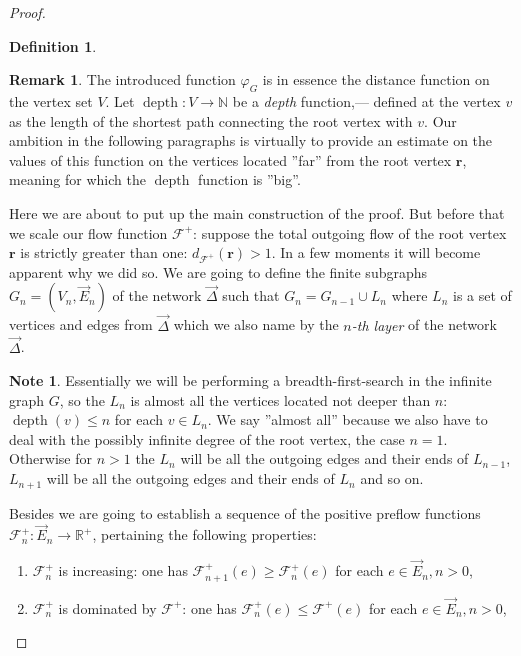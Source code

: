 \documentclass[12pt]{article}
\renewcommand{\leq}{\leqslant}
\renewcommand{\geq}{\geqslant}
\newcommand{\gfi}{\varphi_{G}}
\theoremstyle{definition}
\newtheorem{remark}{Remark}
\newtheorem*{note}{Note}
\newtheorem{definition}{Definition}
\newcommand{\depth}{\operatorname{depth}}
\newcommand{\flowpos}{\mathcal{F}^{+}}
\newcommand{\flowposn}[1]{\mathcal{F}_{#1}^{+}}
\renewcommand{\root}{\mathbf{r}}
\newcommand{\onet}{\vec{\Delta}}
\numberwithin{remark}{section}
\numberwithin{theorem}{section}
\numberwithin{prop}{section}
\numberwithin{equation}{section}
\numberwithin{lemma}{section}
\numberwithin{prop_under_lemma}{lemma}
\begin{document}
\begin{proof}
\begin{definition}
\[        \]
      \end{definition}
      \begin{remark}
        The introduced function $\gfi$ is in essence the distance function on the vertex set $V$.
        Let $\depth: V \to \mathbb{N}$ be a \emph{depth} function,--- defined at the vertex $v$ as the length of the shortest path connecting the root vertex with
          $v$.
        Our ambition in the following paragraphs is virtually to provide an estimate on the values of this function on the vertices
          located ''far'' from the root vertex $\root$, meaning for which the $\depth$ function is ''big''. 
      \end{remark}
      Here we are about to put up the main construction of the proof.
      But before that we scale our flow function $\flowpos$: suppose the total outgoing flow of the root vertex $\root$ is strictly greater than one:
        $d_{\flowpos}(\root) > 1$.
      In a few moments it will become apparent why we did so.
      We are going to define the finite subgraphs $G_n = (V_n, \vec{E}_n)$ of the network $\onet$ such that
        $G_{n} = G_{n-1} \cup L_n$ where $L_n$ is a set of vertices and edges from $\onet$ which we also name by
        the \emph{$n$-th layer} of the network $\onet$.
      \begin{note}
        Essentially we will be performing a breadth-first-search in the infinite graph $G$, so the $L_n$ is
          almost all the vertices located not deeper than $n$: $\depth(v) \leq n$ for each $v \in L_n$.
        We say ''almost all'' because we also have to deal with the possibly infinite degree of the root vertex, the case $n = 1$.
        Otherwise for $n > 1$ the $L_n$ will be all the outgoing edges and their ends of $L_{n-1}$, $L_{n+1}$ will be
          all the outgoing edges and their ends of $L_n$ and so on.
      \end{note}
      Besides we are going to establish a sequence of the positive preflow functions $\flowposn{n}: \vec{E}_n \to \mathbb{R}^{+}$,
        pertaining the following properties:
        \begin{enumerate}[label=\textbf{P\arabic*}]
          \item \label{p1} $\flowposn{n}$ is increasing: one has $\flowposn{n+1}(e) \geq \flowposn{n}(e)$ for each $e \in \vec{E}_n, n > 0$,
          \item \label{p2} $\flowposn{n}$ is dominated by $\flowpos$: one has $\flowposn{n}(e) \leq \flowpos(e)$ for each $e \in \vec{E}_n, n> 0$,

\end{enumerate}
\end{proof}
\end{document}
